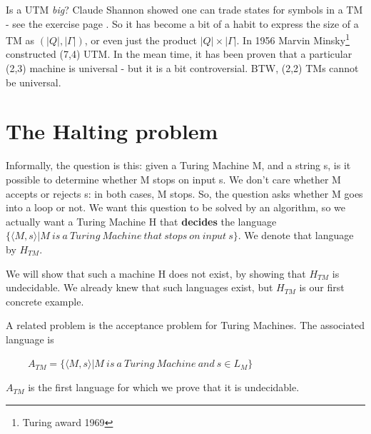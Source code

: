 Is a UTM {\em big}? Claude Shannon showed one can trade states for
symbols in a TM - see the exercise page \pageref{twosymbols}. So it
has become a bit of a habit to express the size of a TM as
$(|Q|,|\Gamma|)$, or even just the product $|Q| \times |\Gamma|$. In
1956 Marvin Minsky\footnote{Turing award 1969} constructed (7,4)
UTM. In the mean time, it has been proven that a particular (2,3)
machine is universal - but it is a bit controversial.  BTW, (2,2) TMs
cannot be universal.



\clearpage
\section{The Halting problem}\label{halting}

Informally, the question is this: given a Turing Machine M, and a
string s, is it possible to determine whether M stops on input s.
We don't care whether M accepts or rejects s: in both cases, M stops.
So, the question asks whether M goes into a loop or not. We want this
question to be solved by an algorithm, so we actually want a
Turing Machine H that {\bf decides} the language
%
$\{\langle M,s \rangle|
M~is~a~Turing~Machine~that~stops~on~input~s\}$. We denote that
language by $H_{TM}$.


We will show that such a machine H does not exist, by showing that
$H_{TM}$ is undecidable. We already knew that such languages exist, but $H_{TM}$ is our first concrete example.

A related problem is the acceptance problem for Turing Machines. The associated language is

$~~~~~~~~~~A_{TM} = \{\langle M,s \rangle| M~is~a~Turing~Machine~and~s
\in L_{M}\}$

$A_{TM}$ is the first language for which we prove that it is
undecidable.

